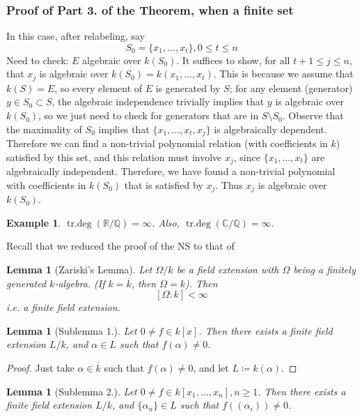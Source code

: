 \documentclass[12pt]{article}
\newcommand{\q}{\mathbb{Q}}
\newcommand{\cx}{\mathbb{C}}
\DeclareMathOperator{\trdeg}{tr.deg}
\def\r{\mathbb{R}}
\newtheorem{lemma}[theorem]{Lemma}
\newtheorem*{eg}{Example}
\theoremstyle{definition}
\begin{document}
\subsubsection*{Proof of Part 3. of the Theorem, when  a finite set}
In this case, after relabeling, say
\[
S_0 =\{x_1,\dots, x_t\}, 0\leq t \leq n
\]
Need to check: $E $ algebraic over $k(S_0)$. It suffices to show, for all $t+1\leq j \leq n$, that $x_j$ is algebraic over $k(S_0)= k(x_1,\dots,x_t)$. This is because we assume that $k(S) = E$, so every element of $E$ is generated by $S$; for any element (generator) $y\in S_0 \subset S$, the algebraic independence trivially implies that $y$ is algebraic over $k(S_0)$, so we just need to check for generators that are in $S\setminus S_0$. Observe that the maximality of $S_0$ implies that $\{x_1,\dots,x_t,x_j\}$ is algebraically dependent. Therefore we can find a non-trivial polynomial relation (with coefficients in $k$) satisfied by this set, and this relation must involve $x_j$, since $\{x_1,\dots ,x_t\}$ are algebraically independent. Therefore, we have found a non-trivial polynomial with coefficients in $k(S_0)$ that is satisfied by $x_j$. Thus $x_j$ is algebraic over $k(S_0)$.
\begin{eg}
$\trdeg(\r/\q) = \infty$. Also, $\trdeg(\cx/\q) = \infty$.
\end{eg}
Recall that we reduced the proof of the NS to that of 
\begin{lemma}[Zariski's Lemma]
Let $\Omega/k$ be a field extension with $\Omega$ being a finitely generated $k$-algebra. (If $k= \overline{k}$, then $\Omega = k$). Then 
\[
[\Omega:k] < \infty
\]
i.e. a finite field extension.
\end{lemma}
\begin{lemma}[Sublemma 1.]
Let $0\neq f \in k[x]$. Then there exists a finite field extension $L/k$, and $\alpha \in L$ such that $f(\alpha)\neq 0$.
\end{lemma}
\begin{proof}
Just take $\alpha \in \overline{k}$ such that $f(\alpha) \neq 0$, and let $L \coloneqq k(\alpha)$.
\end{proof}
\begin{lemma}[Sublemma 2.]
Let $0\neq f \in k[x_1,\dots, x_n], n\geq 1$. Then there exists a finite field extension $L/ k$, and $\{\alpha_n\} \in L $ such that $f((\alpha_i)) \neq 0$. 
\end{lemma}
\end{document}
